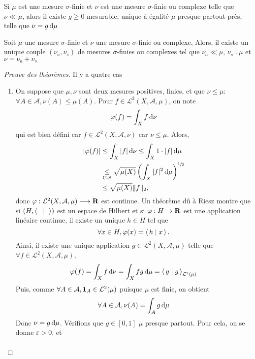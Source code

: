 \begin{thm}
Si $\mu$ est une mesure  $\sigma$-finie et  $\nu$ est une mesure  $\sigma$-finie ou complexe telle que  $\nu\ll\mu$, alors il existe  $g\geq 0$ mesurable, unique à égalité $\mu$-presque partout près, telle que  $\nu=g\mathop{}\!\mathrm d \mu$
\end{thm}

\begin{thm}
    Soit $\mu$ une mesure $\sigma$-finie et  $\nu$ une mesure  $\sigma$-finie ou complexe, Alors, il existe un unique couple  $(\nu_a, \nu_s)$ de mesures  $\sigma$-finies ou complexes tel que  $\nu_a \ll \mu$,  $\nu_s\bot \mu$ et  $\nu=\nu_a+\nu_s$
\end{thm}

\begin{proof}[Preuve des théorèmes]
    Il y a quatre cas \begin{enumerate}
        \item 
            On suppose que $\mu,\nu$ sont deux mesures positives, finies, et que $\nu\leq \mu$:  $\forall A\in \mathcal{A},\nu(A)\leq \mu(A)$.
Pour $f\in \mathcal{L}^2(X,\mathcal{A},\mu)$, on note \[\varphi(f)= \int_Xf\mathop{}\!\mathrm d\nu\] qui est bien défini car $f\in \mathcal{L}^2(X,\mathcal{A},\nu)$ car $\nu\leq \mu$.
Alors,
\begin{align*}
|\varphi(f)|&\leq \int_X |f|\mathop{}\!\mathrm d\nu \leq \int_X 1\cdot |f|\mathop{}\!\mathrm d\mu\\
&\underset{\text{C-S}}{\leq} \sqrt{\mu(X)} \left( \int_X |f|^2 \mathop{}\!\mathrm d\mu\right)^{\sfrac12}\\
&\leq \sqrt{\mu(X)}\|f\|_2,
\end{align*}
donc $\varphi: \mathcal  L^2(X, \mathcal A, \mu)\longrightarrow \mathbf R$ est continue.
    Un théorème dû à Riesz montre que si $(H,\scalar{\;}{\;} )$ est un espace de Hilbert et si $\varphi:H\to \mathbf R$ est une application linéaire continue, il existe un unique $h\in H$
    tel que \[\forall x\in H ,\varphi(x)=\scalar{h}{x} .\]
Ainsi, il existe une unique application $g\in \mathcal{L}^2 (X,\mathcal{A},\mu)$ telle que $\forall f\in \mathcal{L}^2(X,\mathcal{A},\mu)$, \[\varphi(f)=\int_Xf\diff\nu=\int_Xfg\diff\mu = \scalar{y}{g}  _{\mathcal{L}^2(\mu)}\]
Puis, comme $\forall A\in \mathcal{A},\bm{1}_A\in \mathcal{L}^2(\mu)$ puisque $\mu$ est finie, on obtient
\[\forall A\in \mathcal A , \nu(A)=\int_Ag\mathop{}\!\mathrm d\mu\]
Donc $\nu=g\mathop{}\!\mathrm d\mu$.
Vérifions que $g\in [0,1]$ $\mu$ presque partout.
Pour cela, on se donne $\varepsilon >0$, et
\begin{align*}

\end{align*}
\end{enumerate}
\end{proof}
